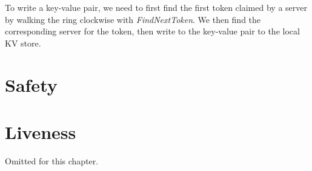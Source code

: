 To write a key-value pair, we need to first find the first token claimed by a
server by walking the ring clockwise with \textit{FindNextToken}. We then find
the corresponding server for the token, then write to the key-value pair to the
local KV store.

\section{Safety} 

\section{Liveness}

Omitted for this chapter.

% 

